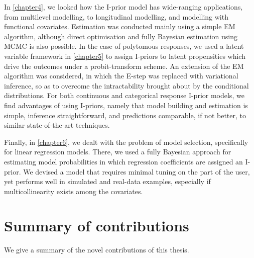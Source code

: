 \documentclass[a4paper,showframe,11pt]{report}
\begin{document}
In \cref{chapter4}, we looked how the I-prior model has wide-ranging applications, from multilevel modelling, to longitudinal modelling, and modelling with functional covariates.
Estimation was conducted mainly using a simple EM algorithm, although direct optimisation and fully Bayesian estimation using MCMC is also possible.
In the case of polytomous responses, we used a latent variable framework in \cref{chapter5} to assign I-priors to latent propensities which drive the outcomes under a probit-transform scheme. 
An extension of the EM algorithm was considered, in which the E-step was replaced with variational inference, so as to overcome the intractability brought about by the conditional distributions.
For both continuous and categorical response I-prior models, we find advantages of using I-priors, namely that model building and estimation is simple, inference  straightforward, and predictions comparable, if not better, to similar state-of-the-art techniques.

Finally, in \cref{chapter6}, we dealt with the problem of model selection, specifically for linear regression models.
There, we used a fully Bayesian approach for estimating model probabilities in which  regression coefficients are assigned an I-prior.
We devised a model that requires minimal tuning on the part of the user, yet performs well in simulated and real-data examples, especially if multicollinearity exists among the covariates.


\section{Summary of contributions}

We give a summary of the novel contributions of this thesis.
\end{document}
